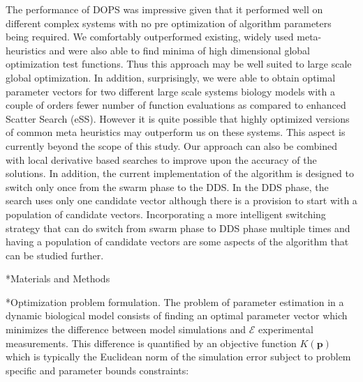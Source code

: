 \documentclass[12pt]{article}
\makeatletter
\renewcommand\subsection{\@startsection
	{subsection}{2}{0mm}
	{-0.05in}
	{-0.5\baselineskip}
	{\normalfont\normalsize\bfseries}}
\renewcommand\section{\@startsection
	{subsection}{2}{0mm}
	{-0.2in}
	{0.05\baselineskip}
	{\normalfont\large\bfseries}}
\makeatother
\begin{document}
The performance of DOPS was impressive given that it performed well on different complex systems with no pre optimization of algorithm parameters being required. We comfortably outperformed existing, widely used meta-heuristics and were also able to find minima of high dimensional global optimization test functions. Thus this approach may be well suited to large scale global optimization. In addition, surprisingly, we were able to obtain optimal parameter vectors for two different large scale systems biology models with a couple of orders fewer number of function evaluations as compared to enhanced Scatter Search (eSS). However it is quite possible that highly optimized versions of common meta heuristics may outperform us on these systems. This aspect is currently beyond the scope of this study. Our approach can also be combined with local derivative based searches to improve upon the accuracy of the solutions. In addition, the current implementation of the algorithm is designed to switch only once from the swarm phase to the DDS. In the DDS phase, the search uses only one candidate vector although there is a provision to start with a population of candidate vectors. Incorporating a more intelligent switching strategy that can do switch from swarm phase to DDS phase multiple times and having a population of candidate vectors are some aspects of the algorithm that can be studied further.

\clearpage

\section*{Materials and Methods}

\subsection*{Optimization problem formulation.}
The problem of parameter estimation in a dynamic biological model consists of finding an optimal parameter vector
which minimizes the difference between model simulations and $\mathcal{E}$ experimental measurements. This difference is quantified by an objective function $K\left(\mathbf{p}\right)$
which is typically the Euclidean norm of the simulation error subject to problem specific and parameter bounds constraints:
\end{document}
